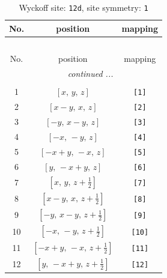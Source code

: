 \documentclass[fleqn,8pt]{jsarticle}
\begin{document}
\begin{longtable}{ccc}
\caption{Wyckoff site: {\tt 12d}, site symmetry: {\tt 1}}
 \\
 \hline \hline
No. & position & mapping \\ \hline \endfirsthead

\multicolumn{2}{l}{\tablename\ \thetable{}} \\
 \hline \hline
No. & position & mapping \\ \hline \endhead

 \hline \hline
\multicolumn{2}{r}{\footnotesize\it continued ...} \\ \endfoot

 \hline \hline
\multicolumn{2}{r}{} \\ \endlastfoot

1 & $\left[ x,\, y,\, z \right]$ & {\tt [1]} \\ \hline
2 & $\left[ x - y,\, x,\, z \right]$ & {\tt [2]} \\ \hline
3 & $\left[ - y,\, x - y,\, z \right]$ & {\tt [3]} \\ \hline
4 & $\left[ - x,\, - y,\, z \right]$ & {\tt [4]} \\ \hline
5 & $\left[ - x + y,\, - x,\, z \right]$ & {\tt [5]} \\ \hline
6 & $\left[ y,\, - x + y,\, z \right]$ & {\tt [6]} \\ \hline
7 & $\left[ x,\, y,\, z + \frac{1}{2} \right]$ & {\tt [7]} \\ \hline
8 & $\left[ x - y,\, x,\, z + \frac{1}{2} \right]$ & {\tt [8]} \\ \hline
9 & $\left[ - y,\, x - y,\, z + \frac{1}{2} \right]$ & {\tt [9]} \\ \hline
10 & $\left[ - x,\, - y,\, z + \frac{1}{2} \right]$ & {\tt [10]} \\ \hline
11 & $\left[ - x + y,\, - x,\, z + \frac{1}{2} \right]$ & {\tt [11]} \\ \hline
12 & $\left[ y,\, - x + y,\, z + \frac{1}{2} \right]$ & {\tt [12]} \\
\end{longtable}
\end{document}
